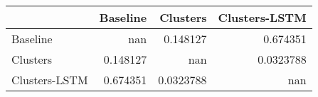 \begin{tabular}{lrrr}
\toprule
               &   Baseline &    Clusters &   Clusters-LSTM \\
\midrule
 Baseline      & nan        &   0.148127  &       0.674351  \\
 Clusters      &   0.148127 & nan         &       0.0323788 \\
 Clusters-LSTM &   0.674351 &   0.0323788 &     nan         \\
\bottomrule
\end{tabular}